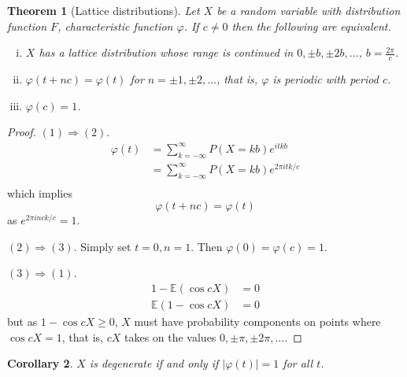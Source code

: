 \documentclass[10pt, oneside, reqno]{amsart}
\theoremstyle{plain}%
\newtheorem{thm}{Theorem}[section]
\newtheorem{cor}[thm]{Corollary}
\theoremstyle{definition}
\theoremstyle{remark}
\renewcommand{\phi}{\varphi}
\newcommand{\E}{\mathbb{E}}
\begin{document}
\begin{thm}[Lattice distributions]
    Let $X$ be a random variable with distribution function $F$, characteristic function $\phi$.  If $c \neq 0$ then the following are equivalent.
    \begin{enumerate}[(i)]
        \item $X$ has a lattice distribution whose range is continued in $0, \pm b, \pm 2b, \dots$, $b = \frac{2 \pi}{c}$.
        \item $\phi(t + nc) = \phi(t)$ for $n = \pm 1, \pm 2, \dots$, that is, $\phi$ is periodic with period $c$. 
        \item $\phi(c) = 1$.  
    \end{enumerate}
\end{thm}
\begin{proof}
    $(1) \Rightarrow (2)$.
    \begin{align*}
        \phi(t) &= \sum_{k=-\infty}^\infty P(X = kb) e^{itkb} \\
        &= \sum_{k=-\infty}^\infty P(X=kb) e^{2\pi i t k /c} \\
    \end{align*} which implies \[
        \phi(t + nc) = \phi(t)
    \] as $e^{2 \pi i n c k /c} = 1$.  
    
    $(2) \Rightarrow (3)$.  Simply set $t = 0, n = 1$.  Then $\phi(0) = \phi(c) = 1$.  
    
    $(3) \Rightarrow (1)$.  \begin{align*}
        1 - \E(\cos cX) &= 0 \\
        \E(1 - \cos cX) &= 0 
    \end{align*}
    but as $1 - \cos cX \geq 0$, $X$ must have probability components on points where $\cos cX = 1$, that is, $c X$ takes on the values $0, \pm \pi, \pm 2 \pi, \dots$.  
\end{proof} 

\begin{cor}
    $X$ is degenerate if and only if $| \phi(t) | = 1$ for all $t$. 
\end{cor}
\end{document}
